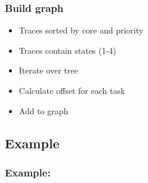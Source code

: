 \documentclass{beamer}
\begin{document}
\begin{frame}
	\frametitle{Build graph}
	\begin{block}{}
		\begin{itemize}
			\item Traces sorted by core and priority
			\item Traces contain states (1-4)
			\item Iterate over tree
			\item Calculate offset for each task
			\item Add to graph
		\end{itemize}
	\end{block}
\end{frame}




\begin{frame}
\section{Example}
	\frametitle{Example:}

\end{frame}
\end{document}
